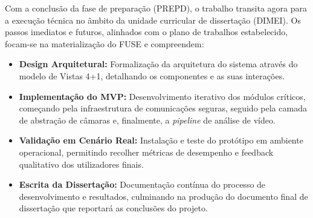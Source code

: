 Com a conclusão da fase de preparação (\gls{PREPD}), o trabalho transita agora para a execução técnica no âmbito da unidade curricular de dissertação (\gls{DIMEI}). Os passos imediatos e futuros, alinhados com o plano de trabalhos estabelecido, focam-se na materialização do \gls{FUSE} e compreendem:

\begin{itemize}
    \item \textbf{Design Arquitetural:} Formalização da arquitetura do sistema através do modelo de Vistas 4+1, detalhando os componentes e as suas interações.
    \item \textbf{Implementação do MVP:} Desenvolvimento iterativo dos módulos críticos, começando pela infraestrutura de comunicações seguras, seguido pela camada de abstração de câmaras e, finalmente, a \textit{pipeline} de análise de vídeo.
    \item \textbf{Validação em Cenário Real:} Instalação e teste do protótipo em ambiente operacional, permitindo recolher métricas de desempenho e feedback qualitativo dos utilizadores finais.
    \item \textbf{Escrita da Dissertação:} Documentação contínua do processo de desenvolvimento e resultados, culminando na produção do documento final de dissertação que reportará as conclusões do projeto.
\end{itemize}
